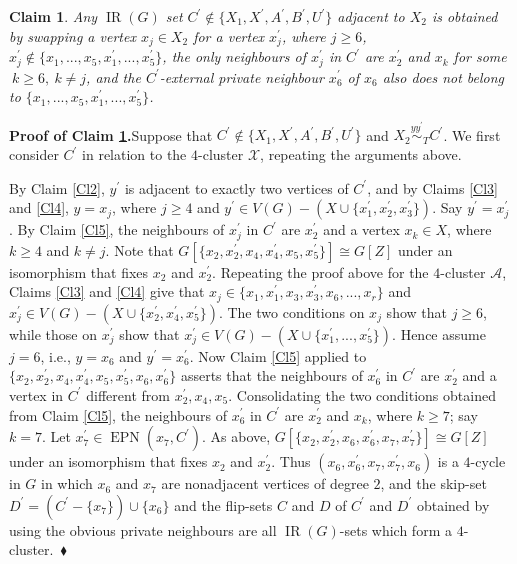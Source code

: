 \documentclass[12pt]{article}%
\newtheorem{claim}{Claim}
\begin{document}
\begin{claim}
\label{Cl6}Any $\operatorname{IR}(G)$ set $C^{\prime}\notin\{X_{1},X^{\prime
},A^{\prime},B^{\prime},U^{\prime}\}$ adjacent to $X_{2}$ is obtained by
swapping a vertex $x_{j}\in X_{2}$ for a vertex $x_{j}^{\prime}$, where
$j\geq6$, $x_{j}^{\prime}\notin\{x_{1},...,x_{5},x_{1}^{\prime},...,x_{5}%
^{\prime}\}$, the only neighbours of $x_{j}^{\prime}$ in $C^{\prime}$ are
$x_{2}^{\prime}$ and $x_{k}$ for some$\ k\geq6,\ k\neq j$, and the $C^{\prime
}$-external private neighbour $x_{6}^{\prime}$ of $x_{6}$ also does not belong
to $\{x_{1},...,x_{5},x_{1}^{\prime},...,x_{5}^{\prime}\}$.
\end{claim}

\noindent\textbf{Proof of Claim \ref{Cl6}.\hspace{0.1in}}Suppose that
$C^{\prime}\notin\{X_{1},X^{\prime},A^{\prime},B^{\prime},U^{\prime}\}$ and
$X_{2}\overset{yy^{\prime}}{\sim}_{T}C^{\prime}$. We first consider
$C^{\prime}$ in relation to the $4$-cluster $\mathcal{X}$, repeating the
arguments above.

By Claim \ref{Cl2}, $y^{\prime}$ is adjacent to exactly two vertices of
$C^{\prime}$, and by Claims \ref{Cl3} and \ref{Cl4}, $y=x_{j}$, where $j\geq4$
and $y^{\prime}\in V(G)-(X\cup\{x_{1}^{\prime},x_{2}^{\prime},x_{3}^{\prime
}\})$. Say $y^{\prime}=x_{j}^{\prime}$. By Claim \ref{Cl5}, the neighbours of
$x_{j}^{\prime}$ in $C^{\prime}$ are $x_{2}^{\prime}$ and a vertex $x_{k}\in
X$, where $k\geq4$ and $k\neq j$. \label{hereFri}Note that $G[\{x_{2}%
,x_{2}^{\prime},x_{4},x_{4}^{\prime},x_{5},x_{5}^{\prime}\}]\cong G[Z]$ under
an isomorphism that fixes $x_{2}$ and $x_{2}^{\prime}$. Repeating the proof
above for the $4$-cluster $\mathcal{A}$, Claims \ref{Cl3} and \ref{Cl4} give
that $x_{j}\in\{x_{1},x_{1}^{\prime},x_{3},x_{3}^{\prime},x_{6},...,x_{r}\}$
and $x_{j}^{\prime}\in V(G)-(X\cup\{x_{2}^{\prime},x_{4}^{\prime}%
,x_{5}^{\prime}\})$. The two conditions on $x_{j}$ show that $j\geq6$, while
those on $x_{j}^{\prime}$ show that $x_{j}^{\prime}\in V(G)-(X\cup
\{x_{1}^{\prime},...,x_{5}^{\prime}\})$. Hence assume $j=6$, i.e., $y=x_{6}$
and $y^{\prime}=x_{6}^{\prime}$. Now Claim \ref{Cl5} applied to $\{x_{2}%
,x_{2}^{\prime},x_{4},x_{4}^{\prime},x_{5},x_{5}^{\prime},x_{6},x_{6}^{\prime
}\}$ asserts that the neighbours of $x_{6}^{\prime}$ in $C^{\prime}$ are
$x_{2}^{\prime}$ and a vertex in $C^{\prime}$ different from $x_{2}^{\prime
},x_{4},x_{5}$. Consolidating the two conditions obtained from Claim
\ref{Cl5}, the neighbours of $x_{6}^{\prime}$ in $C^{\prime}$ are
$x_{2}^{\prime}$ and $x_{k}$, where $k\geq7$; say $k=7$. Let $x_{7}^{\prime
}\in\operatorname{EPN}(x_{7},C^{\prime})$. As above, $G[\{x_{2},x_{2}^{\prime
},x_{6},x_{6}^{\prime},x_{7},x_{7}^{\prime}\}]\cong G[Z]$ under an isomorphism
that fixes $x_{2}$ and $x_{2}^{\prime}$. Thus $(x_{6},x_{6}^{\prime}%
,x_{7},x_{7}^{\prime},x_{6})$ is a $4$-cycle in $G$ in which $x_{6}$ and
$x_{7}$ are nonadjacent vertices of degree $2$, and the skip-set $D^{\prime
}=(C^{\prime}-\{x_{7}\})\cup\{x_{6}\}$ and the flip-sets $C$ and $D$ of
$C^{\prime}$ and $D^{\prime}$ obtained by using the obvious private neighbours
are all $\operatorname{IR}(G)$-sets which form a $4$-cluster.~$\blacklozenge
$\medskip
\end{document}
